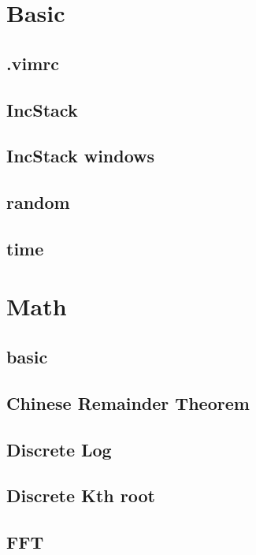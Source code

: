 \section{Basic}
\subsection{.vimrc}

\subsection{IncStack}

\subsection{IncStack windows}

\subsection{random}

\subsection{time}


\section{Math}
\subsection{basic}

\subsection{Chinese Remainder Theorem}

\subsection{Discrete Log}

\subsection{Discrete Kth root}

\subsection{FFT}

